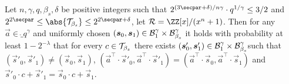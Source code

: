\begin{lemma}\label{lem:keyhidden}
  Let $n,\gamma,q,\beta_s, \delta$ be positive integers such that $2^{(3\secpar+\delta)/n\gamma} \cdot q^{1/\gamma} \leq 3/2$ and $2^{2\secpar} \leq \abs{\tern_{\beta_s}} \leq 2^{2\secpar + \delta}$, let $\ring=\ZZ[x]/(x^n+1)$. Then for any $\vec{a}\in\ring_q^\gamma$ and uniformly chosen $(\boldsymbol{s}_0,\boldsymbol{s}_1)\in \mathcal{B}_{1}^\gamma \times \mathcal{B}_{\beta_s}^\gamma$ it holds with probability at least $1-2^{-\lambda}$ that for every $c\in \mathcal{T}_{\beta_s}$ there exists $(\boldsymbol{s}'_0,\boldsymbol{s}'_1)\in \mathcal{B}_{1}^\gamma \times \mathcal{B}_{\beta_s}^\gamma$such that $(\vec{s}'_0,\vec{s}'_1)\neq(\vec{s}_0,\vec{s}_1)$, $(\vec{a}^\intercal\cdot\vec{s}'_0,\vec{a}^\intercal\cdot\vec{s}'_1) = (\vec{a}^\intercal\cdot\vec{s}_0,\vec{a}^\intercal\cdot\vec{s}_1)$ and $\vec{s}'_0\cdot c + \vec{s}'_1 = \vec{s}_0\cdot c + \vec{s}_1$.
\end{lemma}
